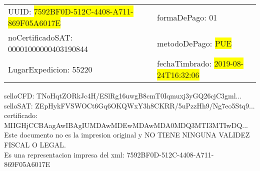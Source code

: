 \documentclass{article}
\begin{document}
\begin{tabular}{p{11cm}p{1cm}p{8cm}}
\bigskip
UUID: \colorbox{yellow}{ 7592BF0D-512C-4408-A711-869F05A6017E } & & formaDePago: 01\\

noCertificadoSAT: 00001000000403190844 & & metodoDePago: \colorbox{yellow}{ PUE }\\

LugarExpedicion: 55220 & & fechaTimbrado: \colorbox{yellow}{ 2019-08-24T16:32:06 } \\
\end{tabular}

\bigskip
selloCFD: TNoHqtZORkJc4H/ESlRg16uwgB8cmT0Iqmuxj3yGQ26cjC3gml... \\
selloSAT: ZEpHykFVSWOCt6Gq6OKQWxY3h8CKRR/5uPzzHh9/Ng7eo5Stq9... \\

certificado: MIIGHjCCBAagAwIBAgIUMDAwMDEwMDAwMDA0MDQ3MTI3MTIwDQ...\bigskip\bigskip\bigskip\bigskip\bigskip\bigskip
\\Este documento no es la impresion original y NO TIENE NINGUNA VALIDEZ FISCAL O LEGAL. \\
 Es una representacion impresa del xml:  7592BF0D-512C-4408-A711-869F05A6017E \\
\end{document}
